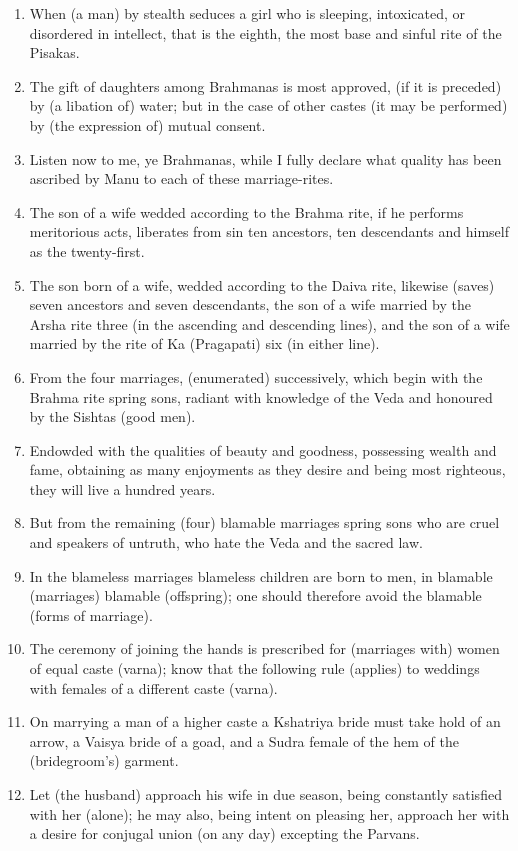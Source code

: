 \begin{enumerate}
\item When (a man) by stealth seduces a girl who is sleeping, intoxicated, or disordered in intellect, that is the eighth, the most base and sinful rite of the Pisakas.
\item The gift of daughters among Brahmanas is most approved, (if it is preceded) by (a libation of) water; but in the case of other castes (it may be performed) by (the expression of) mutual consent.
\item Listen now to me, ye Brahmanas, while I fully declare what quality has been ascribed by Manu to each of these marriage-rites.
\item The son of a wife wedded according to the Brahma rite, if he performs meritorious acts, liberates from sin ten ancestors, ten descendants and himself as the twenty-first.
\item The son born of a wife, wedded according to the Daiva rite, likewise (saves) seven ancestors and seven descendants, the son of a wife married by the Arsha rite three (in the ascending and descending lines), and the son of a wife married by the rite of Ka (Pragapati) six (in either line).
\item From the four marriages, (enumerated) successively, which begin with the Brahma rite spring sons, radiant with knowledge of the Veda and honoured by the Sishtas (good men).
\item Endowded with the qualities of beauty and goodness, possessing wealth and fame, obtaining as many enjoyments as they desire and being most righteous, they will live a hundred years.
\item But from the remaining (four) blamable marriages spring sons who are cruel and speakers of untruth, who hate the Veda and the sacred law.
\item In the blameless marriages blameless children are born to men, in blamable (marriages) blamable (offspring); one should therefore avoid the blamable (forms of marriage).
\item The ceremony of joining the hands is prescribed for (marriages with) women of equal caste (varna); know that the following rule (applies) to weddings with females of a different caste (varna).
\item On marrying a man of a higher caste a Kshatriya bride must take hold of an arrow, a Vaisya bride of a goad, and a Sudra female of the hem of the (bridegroom's) garment.
\item Let (the husband) approach his wife in due season, being constantly satisfied with her (alone); he may also, being intent on pleasing her, approach her with a desire for conjugal union (on any day) excepting the Parvans.

\end{enumerate}
